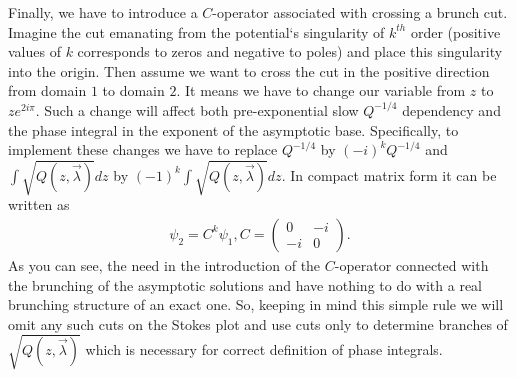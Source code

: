 \documentclass[aps,prl,preprint,superscriptaddress]{revtex4}
\begin{document}
Finally, we have to introduce a $C$-operator associated with crossing a brunch cut. Imagine the cut emanating from the potential`s singularity of $k^{th}$ order (positive values of $k$ corresponds to zeros and negative to poles) and place this singularity into the origin. Then assume we want to cross the cut in the positive direction from domain $1$ to domain $2$. It means we have to change our variable from $z$ to $z e^{2i\pi}$. Such a change will affect both pre-exponential slow $Q^{-1/4}$ dependency and the phase integral in the exponent of the asymptotic base. Specifically, to implement these changes we have to replace $Q^{-1/4}$ by $(-i)^k Q^{-1/4}$ 
and $\int \sqrt{Q(z,\vec{\lambda})} dz$ by $(-1)^k \int \sqrt{Q(z,\vec{\lambda})} dz$. In compact matrix form it can be written as
\begin{eqnarray}
\psi_2 = C^k \psi_1, C =  \begin{pmatrix} 0 & -i \\ -i & 0 \end{pmatrix}.    \label{C}
\end{eqnarray}
As you can see, the need in the introduction of the $C$-operator connected with the brunching of the asymptotic solutions and have nothing to do with a real brunching structure of an exact one. So, keeping in mind this simple rule we will omit any such cuts on the Stokes plot and use cuts only to determine branches of $\sqrt{Q(z,\vec \lambda)}$ which is necessary for correct definition of phase integrals. 
\end{document}
